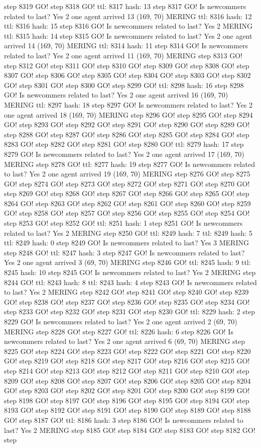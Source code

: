step 8319 GO! step 8318 GO! ttl: 8317 hash: 13 step 8317 GO! Is newcommers related to last? Yes 2 one agent arrived 13 (169, 70) MERING ttl: 8316 hash: 12 ttl: 8316 hash: 15 step 8316 GO! Is newcommers related to last? Yes 2 MERING ttl: 8315 hash: 14 step 8315 GO! Is newcommers related to last? Yes 2 one agent arrived 14 (169, 70) MERING ttl: 8314 hash: 11 step 8314 GO! Is newcommers related to last? Yes 2 one agent arrived 11 (169, 70) MERING step 8313 GO! step 8312 GO! step 8311 GO! step 8310 GO! step 8309 GO! step 8308 GO! step 8307 GO! step 8306 GO! step 8305 GO! step 8304 GO! step 8303 GO! step 8302 GO! step 8301 GO! step 8300 GO! step 8299 GO! ttl: 8298 hash: 16 step 8298 GO! Is newcommers related to last? Yes 2 one agent arrived 16 (169, 70) MERING ttl: 8297 hash: 18 step 8297 GO! Is newcommers related to last? Yes 2 one agent arrived 18 (169, 70) MERING step 8296 GO! step 8295 GO! step 8294 GO! step 8293 GO! step 8292 GO! step 8291 GO! step 8290 GO! step 8289 GO! step 8288 GO! step 8287 GO! step 8286 GO! step 8285 GO! step 8284 GO! step 8283 GO! step 8282 GO! step 8281 GO! step 8280 GO! ttl: 8279 hash: 17 step 8279 GO! Is newcommers related to last? Yes 2 one agent arrived 17 (169, 70) MERING step 8278 GO! ttl: 8277 hash: 19 step 8277 GO! Is newcommers related to last? Yes 2 one agent arrived 19 (169, 70) MERING step 8276 GO! step 8275 GO! step 8274 GO! step 8273 GO! step 8272 GO! step 8271 GO! step 8270 GO! step 8269 GO! step 8268 GO! step 8267 GO! step 8266 GO! step 8265 GO! step 8264 GO! step 8263 GO! step 8262 GO! step 8261 GO! step 8260 GO! step 8259 GO! step 8258 GO! step 8257 GO! step 8256 GO! step 8255 GO! step 8254 GO! step 8253 GO! step 8252 GO! ttl: 8251 hash: 1 step 8251 GO! Is newcommers related to last? Yes 2 MERING step 8250 GO! ttl: 8249 hash: 7 ttl: 8249 hash: 5 ttl: 8249 hash: 0 step 8249 GO! Is newcommers related to last? Yes 3 MERING step 8248 GO! ttl: 8247 hash: 3 step 8247 GO! Is newcommers related to last? Yes 2 one agent arrived 3 (69, 70) MERING step 8246 GO! ttl: 8245 hash: 9 ttl: 8245 hash: 10 step 8245 GO! Is newcommers related to last? Yes 2 MERING step 8244 GO! ttl: 8243 hash: 8 ttl: 8243 hash: 4 step 8243 GO! Is newcommers related to last? Yes 2 MERING step 8242 GO! step 8241 GO! step 8240 GO! step 8239 GO! step 8238 GO! step 8237 GO! step 8236 GO! step 8235 GO! step 8234 GO! step 8233 GO! step 8232 GO! step 8231 GO! step 8230 GO! ttl: 8229 hash: 2 step 8229 GO! Is newcommers related to last? Yes 2 one agent arrived 2 (69, 70) MERING step 8228 GO! step 8227 GO! ttl: 8226 hash: 6 step 8226 GO! Is newcommers related to last? Yes 2 one agent arrived 6 (69, 70) MERING step 8225 GO! step 8224 GO! step 8223 GO! step 8222 GO! step 8221 GO! step 8220 GO! step 8219 GO! step 8218 GO! step 8217 GO! step 8216 GO! step 8215 GO! step 8214 GO! step 8213 GO! step 8212 GO! step 8211 GO! step 8210 GO! step 8209 GO! step 8208 GO! step 8207 GO! step 8206 GO! step 8205 GO! step 8204 GO! step 8203 GO! step 8202 GO! step 8201 GO! step 8200 GO! step 8199 GO! step 8198 GO! step 8197 GO! step 8196 GO! step 8195 GO! step 8194 GO! step 8193 GO! step 8192 GO! step 8191 GO! step 8190 GO! step 8189 GO! step 8188 GO! step 8187 GO! ttl: 8186 hash: 3 step 8186 GO! Is newcommers related to last? Yes 2 MERING step 8185 GO! step 8184 GO! step 8183 GO! step 8182 GO! step 